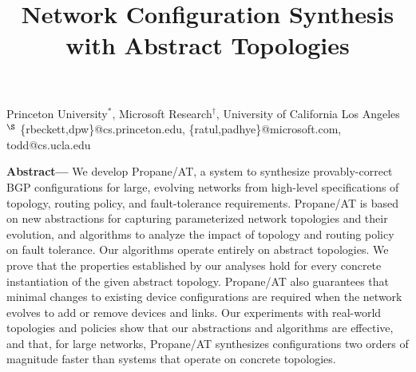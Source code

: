 \documentclass[numbers, 10pt, preprint]{sigplanconf}
\newcommand{\sysname}{{\text{}\small \sf Propane/AT}\xspace}
\begin{document}

\setlength{\pdfpageheight}{\paperheight}
\setlength{\pdfpagewidth}{\paperwidth}



\title{Network Configuration Synthesis with Abstract Topologies \vspace{1cm}}




{Princeton University$^*$, Microsoft Research$^\dagger$, University of California Los Angeles$^\S$}
{\{rbeckett,dpw\}@cs.princeton.edu, \{ratul,padhye\}@microsoft.com, todd@cs.ucla.edu}

\maketitle


%
%
%
%

\textbf{Abstract---}
We develop \sysname, a system to synthesize provably-correct
BGP configurations for large, evolving networks from high-level
specifications of topology, routing policy, and fault-tolerance
requirements. \sysname is based on new abstractions for capturing
parameterized network topologies and their evolution, and algorithms
to analyze the impact of topology and routing policy on fault
tolerance. Our algorithms operate entirely on abstract topologies.  We
prove that the properties established by our analyses hold for every
concrete instantiation of the given abstract topology. \sysname
also guarantees that minimal changes to existing device configurations
are required when the network evolves to add or remove devices and
links. Our experiments with real-world topologies and policies show
that our abstractions and algorithms are effective, and that, for large
networks, \sysname synthesizes configurations two orders of magnitude
faster than systems that operate on concrete topologies.
\end{document}
